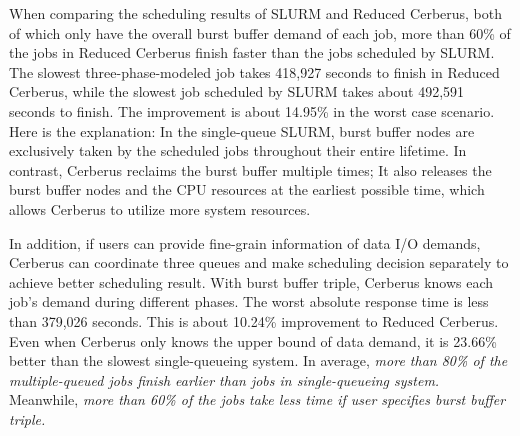 When comparing the scheduling results of SLURM and Reduced Cerberus,
both of which only have the overall burst buffer demand of each job,
more than 60\% of the jobs in Reduced Cerberus finish faster than the jobs scheduled by
SLURM.
The slowest three-phase-modeled job takes 418,927 seconds to finish in Reduced Cerberus,
while the slowest job scheduled by SLURM takes about 492,591 seconds to finish.
The improvement is about 14.95\% in the worst case scenario.
Here is the explanation: In the single-queue SLURM, burst buffer nodes
are exclusively taken by the scheduled jobs throughout their entire lifetime.
In contrast, Cerberus reclaims the burst buffer multiple times;
It also releases the burst buffer nodes and the CPU resources at the earliest possible time, which allows Cerberus to utilize more system resources.

In addition, if users can provide fine-grain information of data I/O demands,
Cerberus can coordinate three queues and make scheduling decision separately to achieve better scheduling result.
With burst buffer triple, Cerberus knows each job's demand during different phases.
The worst absolute response time is less than 379,026 seconds.
This is about 10.24\% improvement to Reduced Cerberus.
Even when Cerberus only knows the upper bound of data demand,
it is 23.66\% better than the slowest single-queueing system.
In average, \textit{more than 80\% of the multiple-queued jobs
finish earlier than jobs in single-queueing system.}
Meanwhile, \textit{more than 60\% of the jobs take less time if user
specifies burst buffer triple.}

